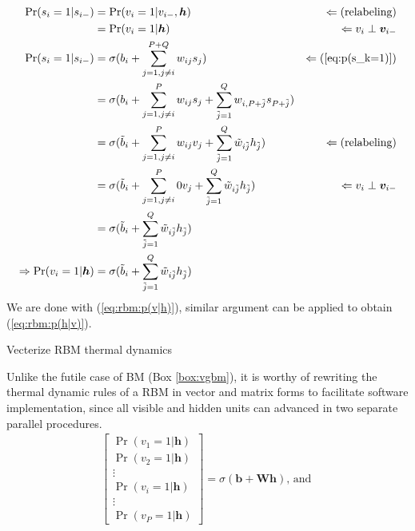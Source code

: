 \documentclass[11pt]{article}
\newcommand{\vb}{\boldsymbol{b}}
\newcommand{\vh}{\boldsymbol{h}}
\newcommand{\vv}{\boldsymbol{v}}
\newcommand{\mw}{\boldsymbol{W}}
\begin{document}
{\begin{align*}
  \Pr(s_i=1|s_{i-}) & = \Pr(v_i=1|v_{i-}, \vh)                                  & \Leftarrow (\textrm{relabeling}) \\
                    & = \Pr(v_i=1|\vh)                                          & \Leftarrow v_i \perp \vv_{i-}    \\
  \Pr(s_i=1|s_{i-}) & = \sigma(b_i + \sum_{j=1, j \ne i}^{P+Q}{w_{ij}s_j} )     & \Leftarrow (\ref{eq:p(s_k=1)})   \\
                    & = \sigma(b_i + \sum_{j=1, j \ne i}^P{w_{ij}s_j}
                      + \sum_{\jt=1}^{Q}{w_{i,P+\jt}s_{P+\jt}})                                                    \\
                    & = \sigma(\bt_i + \sum_{j=1, j \ne i}^P{w_{ij}v_j}
                      + \sum_{\jt=1}^{Q}{\wt_{i\jt}h_{\jt}})                    & \Leftarrow (\textrm{relabeling}) \\
                    & = \sigma(\bt_i + \sum_{j=1, j \ne i}^P{0 v_j}
                      + \sum_{\jt=1}^{Q}{\wt_{i\jt}h_{\jt}})                    & \Leftarrow v_i \perp \vv_{i-}    \\
                    & = \sigma(\bt_i + \sum_{\jt=1}^Q{\wt_{i\jt}h_{\jt}})                                          \\
  \Rightarrow \Pr(v_i=1|\vh) & = \sigma(\bt_i + \sum_{\jt=1}^Q{\wt_{i\jt}h_{\jt}})
\end{align*}
We are done with (\ref{eq:rbm:p(v|h)}), similar argument can be applied to obtain (\ref{eq:rbm:p(h|v)}).
\begin{framedbox}[h]
  \centering
  \caption{Vecterize RBM thermal dynamics}\label{box:vrbm}
  \begin{minipage}{1.0\linewidth}
    Unlike the futile case of BM (Box \ref{box:vgbm}), it is worthy of rewriting the thermal dynamic rules of a RBM in vector and matrix forms to facilitate software implementation, since all visible and
    hidden units can advanced in two separate parallel procedures.
    \begin{align*}
      \begin{bmatrix}
        \Pr(v_1=1|\vh) \\
        \Pr(v_2=1|\vh) \\
        \vdots \\
        \Pr(v_i=1|\vh) \\
        \vdots \\
        \Pr(v_P=1|\vh)
      \end{bmatrix} = \sigma(\vb + \mw  \vh) \textrm{, and }

\end{align*}
\end{minipage}
\end{framedbox}}
\end{document}
